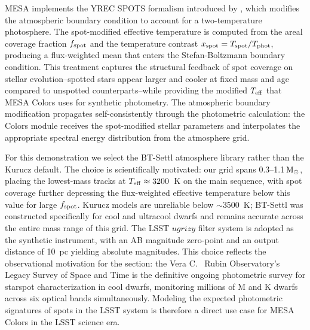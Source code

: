 \documentclass[linenumbers,apj,twocolumn, floatfix]{aastex701}
\begin{document}
MESA implements the YREC SPOTS formalism introduced by \citet{Somers2015}, which modifies the atmospheric boundary condition to account for a two-temperature photosphere.
The spot-modified effective temperature is computed from the areal coverage fraction $f_{\rm spot}$ and the temperature contrast $x_{\rm spot} = T_{\rm spot}/T_{\rm phot}$, producing a flux-weighted mean that enters the Stefan-Boltzmann boundary condition.
This treatment captures the structural feedback of spot coverage on stellar evolution--spotted stars appear larger and cooler at fixed mass and age compared to unspotted counterparts--while providing the modified $T_{\rm eff}$ that MESA Colors uses for synthetic photometry.
The atmospheric boundary modification propagates self-consistently through the photometric calculation: the Colors module receives the spot-modified stellar parameters and interpolates the appropriate spectral energy distribution from the atmosphere grid.

For this demonstration we select the BT-Settl atmosphere library \citep{Allard2012} rather than the Kurucz default.
The choice is scientifically motivated: our grid spans 0.3--1.1\,$\rm M_\odot$, placing the lowest-mass tracks at $T_{\rm eff} \approx 3200$~K on the main sequence, with spot coverage further depressing the flux-weighted effective temperature below this value for large $f_{\rm spot}$.
Kurucz models are unreliable below $\sim$3500~K; BT-Settl was constructed specifically for cool and ultracool dwarfs and remains accurate across the entire mass range of this grid.
The LSST $ugrizy$ filter system is adopted as the synthetic instrument, with an AB magnitude zero-point and an output distance of 10~pc yielding absolute magnitudes.
This choice reflects the observational motivation for the section: the Vera C.
\ Rubin Observatory's Legacy Survey of Space and Time \citep{LSST}
is the definitive ongoing photometric survey for starspot characterization in cool dwarfs, monitoring millions of M and K dwarfs across six optical bands simultaneously.
Modeling the expected photometric signatures of spots in the LSST system is therefore a direct use case for MESA Colors in the LSST science era.
\end{document}
